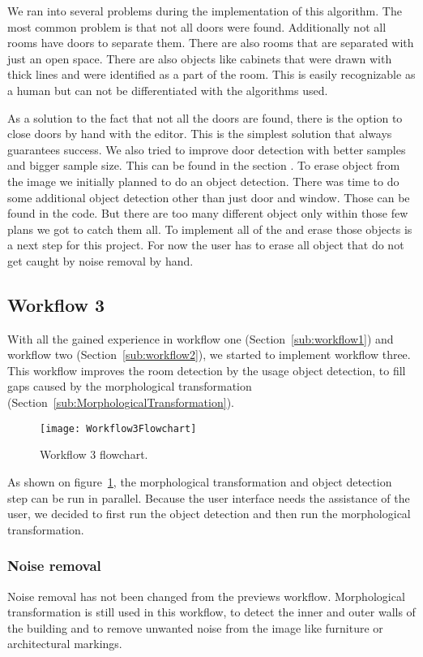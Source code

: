 We ran into several problems during the implementation of this algorithm. The most common problem is that not all doors were found. Additionally not all rooms have doors to separate them. There are also rooms that are separated with just an open space. There are also objects like cabinets that were drawn with thick lines and were identified as a part of the room. This is easily recognizable as a human but can not be differentiated with the algorithms used.

As a solution to the fact that not all the doors are found, there is the option to close doors by hand with the editor. This is the simplest solution that always guarantees success. We also tried to improve door detection with better samples and bigger sample size. This can be found in the section .
To erase object from the image we initially planned to do an object detection. There was time to do some additional object detection other than just door and window. Those can be found in the code. But there are too many different object only within those few plans we got to catch them all. To implement all of the and erase those objects is a next step for this project. For now the user has to erase all object that do not get caught by noise removal by hand.


\subsection{Workflow 3}
\label{sub:workflow3}
With all the gained experience in workflow one (Section~\ref{sub:workflow1}) and workflow two (Section~\ref{sub:workflow2}), we started to implement workflow three. This workflow improves the room detection by the usage object detection, to fill gaps caused by the morphological transformation (Section~\ref{sub:MorphologicalTransformation}).

\begin{figure}[H]
	\centering
	\texttt{[image: Workflow3Flowchart]}
	\caption{Workflow 3 flowchart.}
	\label{fig:Workflow3Flowchart}
\end{figure}

As shown on figure~\ref{fig:Workflow3Flowchart}, the morphological transformation and object detection step can be run in parallel. Because the user interface needs the assistance of the user, we decided to first run the object detection and then run the morphological transformation.

\subsubsection{Noise removal}
Noise removal has not been changed from the previews workflow. Morphological transformation is still used in this workflow, to detect the inner and outer walls of the building and to remove unwanted noise from the image like furniture or architectural markings.

